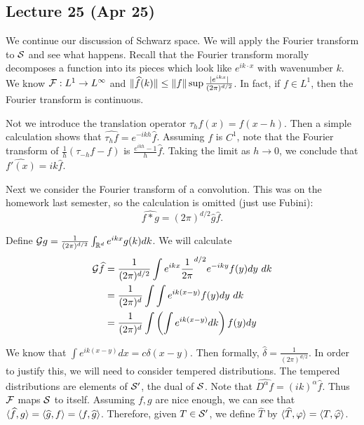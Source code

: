 \documentclass[10pt, twoside]{article}
\begin{document}
    \subsection{Lecture 25 (Apr 25)}
    We continue our discussion of Schwarz space. We will apply the Fourier transform to $\mathcal{S}$ and see what happens. Recall that the Fourier transform morally decomposes a function into its pieces which look like $e^{ik\cdot x}$ with wavenumber $k$. We know $\mathcal{F}:L^1 \to L^{\infty}$ and $\lVert\widehat{f}(k)\rVert\leq \lVert f\rVert \sup \frac{\lvert e^{ikx}\rvert}{(2\pi)^{d/2}}$. In fact, if $f \in L^1$, then the Fourier transform is continuous.

    Not we introduce the translation operator $\tau_h f(x) = f(x-h)$. Then a simple calculation shows that $\widehat{\tau_h f} = e^{-ikh} \widehat{f}$. Assuming $f$ is $C^1$, note that the Fourier transform of $\frac{1}{h} (\tau_{-h}f - f)$ is $\frac{e^{ikh}-1}{h} \widehat{f}$. Taking the limit as $h \to 0$, we conclude that $\widehat{f'(x)} = ik \widehat{f}$.

    Next we consider the Fourier transform of a convolution. This was on the homework last semester, so the calculation is omitted (just use Fubini): \[\widehat{f*g} = (2\pi)^{d/2} \widehat{g} \widehat{f}.\] 

    Define $\mathcal{G}g = \frac{1}{(2\pi)^{d/2}} \int_{\mathbb{R}^d} e^{ikx} g(k) dk$. We will calculate 
    \begin{align*}
        \mathcal{G}\widehat{f} &= \frac{1}{(2\pi)^{d/2}} \int e^{ikx} \frac{1}{2\pi}^{d/2}e^{-iky} f(y) dy\ dk\\
                          &= \frac{1}{(2\pi)^d} \int \int e^{ik(x-y)}f(y) dy\ dk \\
                          &= \frac{1}{(2\pi)^d} \int \left( \int e^{ik(x-y)} dk \right) f(y) dy
    \end{align*}

    We know that $\int e^{ik(x-y)} dx = c \delta(x-y)$. Then formally, $\widehat{\delta} = \frac{1}{(2\pi)^{d/2}}$. In order to justify this, we will need to consider tempered distributions. The tempered distributions are elements of $\mathcal{S'}$, the dual of $\mathcal{S}$. Note that $\widehat{D^{\alpha}f} = (ik)^{\alpha} \widehat{f}$. Thus $\mathcal{F}$ maps $\mathcal{S}$ to itself. Assuming $f,g$ are nice enough, we can see that $\langle\widehat{f},g\rangle = \langle\widehat{g},f\rangle = \langle f,\widehat{g}\rangle$. Therefore, given $T \in \mathcal{S'}$, we define $\widehat{T}$ by $\langle\widehat{T}, \varphi\rangle = \langle T,\widehat{\varphi}\rangle$.
\end{document}
